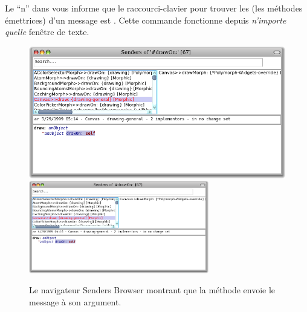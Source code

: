 \documentclass[a4paper,10pt,twoside]{book}
\begin{document}
Le ``n'' dans  vous informe que le
raccourci-clavier pour trouver les \senders (\ie les méthodes émettrices) d'un message
est . Cette commande fonctionne depuis \emph{n'importe
quelle} fenêtre de texte. %


\begin{figure}[htbp]
	\begin{center}
   \ifluluelse
		{\includegraphics[width=\textwidth]{CanvasDraw}}
		{\includegraphics[width=0.7\textwidth]{CanvasDraw}}
	\end{center}
	\caption{Le navigateur Senders Browser montrant que la méthode  envoie le message  à son argument.	}
\end{figure}

\end{document}
